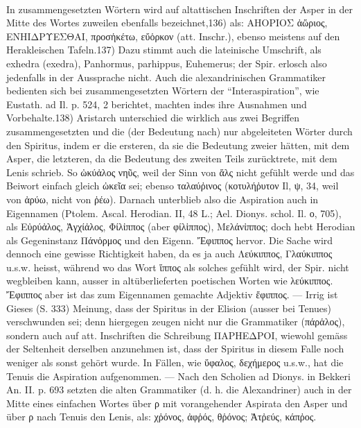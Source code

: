 \paragraph{} In zusammengesetzten Wörtern wird auf altattischen Inschriften der
Asper in der Mitte des Wortes zuweilen ebenfalls bezeichnet,136) als: ΑΗΟΡΙΟΣ
ἀὥριος, ΕΝΗΙΔΡΥΕΣΘΑΙ, προσἡκέτω, εὔὁρκον (att. Inschr.), ebenso meistens auf den
Herakleischen Tafeln.137) Dazu stimmt auch die lateinische Umschrift, als
exhedra (exedra), Panhormus, parhippus, Euhemerus; der Spir. erlosch also
jedenfalls in der Aussprache nicht. Auch die alexandrinischen Grammatiker
bedienten sich bei zusammengesetzten Wörtern der “Interaspiration”, wie Eustath.
ad Il. p. 524, 2 berichtet, machten indes ihre Ausnahmen und Vorbehalte.138)
Aristarch unterschied die wirklich aus zwei Begriffen zusammengesetzten und die
(der Bedeutung nach) nur abgeleiteten Wörter durch den Spiritus, indem er die
ersteren, da sie die Bedeutung zweier hätten, mit dem Asper, die letzteren, da
die Bedeutung des zweiten Teils zurücktrete, mit dem Lenis schrieb. So ὠκύἀλος
νηῦς, weil der Sinn von ἅλς nicht gefühlt werde und das Beiwort einfach gleich
ὠκεῖα sei; ebenso ταλαύῤινος (κοτυλήῤυτον Il, ψ, 34, weil von ἀρύω, nicht von
ῥέω). Darnach unterblieb also die Aspiration auch in Eigennamen (Ptolem. Ascal.
Herodian. II, 48 L.; Ael. Dionys. schol. Il. ο, 705), als Εὐρύἀλος, Ἀγχίἀλος,
Φίλἰππος (aber φίλἱππος), Μελάνἰππος; doch hebt Herodian als Gegeninstanz
Πάνὁρμος und den Eigenn. Ἔφιππος hervor. Die Sache wird dennoch eine gewisse
Richtigkeit haben, da es ja auch Λεύκιππος, Γλαύκιππος u.s.w. heisst, während
wo das Wort ἵππος als solches gefühlt wird, der Spir. nicht wegbleiben kann,
ausser in altüberlieferten poetischen Worten wie λεύκιππος. Ἔφιππος aber ist das
zum Eigennamen gemachte Adjektiv ἔφιππος. — Irrig ist Gieses (S. 333) Meinung,
dass der Spiritus in der Elision (ausser bei Tenues) verschwunden sei; denn
hiergegen zeugen nicht nur die Grammatiker (πάρἁλος), sondern auch auf att.
Inschriften die Schreibung ΠΑΡΗΕΔΡΟΙ, wiewohl gemäss der Seltenheit derselben
anzunehmen ist, dass der Spiritus in diesem Falle noch weniger als sonst gehört
wurde. In Fällen, wie ὕφαλος, δεχήμερος u.s.w., hat die Tenuis die Aspiration
aufgenommen. — Nach den Scholien ad Dionys. in Bekkeri An. II. p. 693 setzten
die alten Grammatiker (d. h. die Alexandriner) auch in der Mitte eines einfachen
Wortes über ρ mit vorangehender Aspirata den Asper und über ρ nach Tenuis den
Lenis, als: χῥόνος, ἀφῥός, θῥόνος; Ἀτῤεύς, κάπῤος. 

